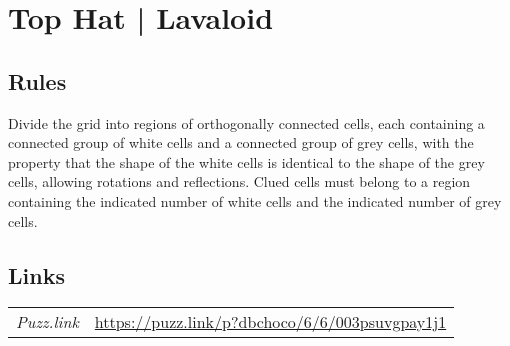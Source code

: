 \section[Top Hat | Lavaloid {[\emph{Double Choco}]}]{Top Hat | {\normalfont Lavaloid}}
\label{sec:34-top-hat-lavaloid}

\subsection*{Rules}
\begin{markdown}
Divide the grid into regions of orthogonally connected cells, each containing a connected group of white cells and a connected group of grey cells, with the property that the shape of the white cells is identical to the shape of the grey cells, allowing rotations and reflections. Clued cells must belong to a region containing the indicated number of white cells and the indicated number of grey cells.
\end{markdown}
\subsection*{Links}
\begin{tabularx}{\textwidth}{l X}
\emph{Puzz.link} & \url{https://puzz.link/p?dbchoco/6/6/003psuvgpay1j1} \\
\end{tabularx}
\pagebreak
